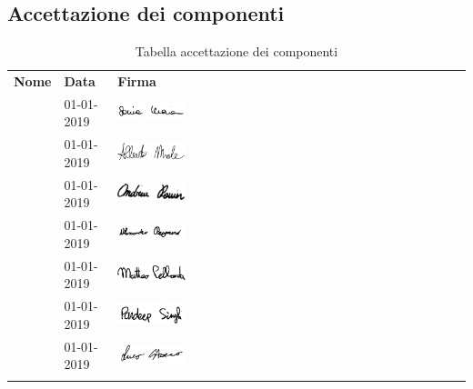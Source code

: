 \begin{appendix}
\subsection{Accettazione dei componenti}
\begin{center}
	\renewcommand{\arraystretch}{1.5}
	\begin{longtable}[H]{  p{3.5cm}  p{2cm} p{4cm}  }
		\rowcolor{tableHeadYellow}
		\textbf{Nome}   & \textbf{Data} & \textbf{Firma}\\
		\sonia & 01-01-2019 & \includegraphics[width=0.2\textwidth]{../includes/pics/firme/firma_sonia.png}\\
		\alberto & 01-01-2019 & \includegraphics[width=0.2\textwidth]{../includes/pics/firme/firma_alberto.png}\\
		\andrea & 01-01-2019 & \includegraphics[width=0.2\textwidth]{../includes/pics/firme/firma_andrea.png}\\
		\alessandro & 01-01-2019 & \includegraphics[width=0.2\textwidth]{../includes/pics/firme/firma_alessandro.png}\\
		\matteo & 01-01-2019 & \includegraphics[width=0.2\textwidth]{../includes/pics/firme/firma_matteo.png}\\
		\pardeep & 01-01-2019 & \includegraphics[width=0.2\textwidth]{../includes/pics/firme/firma_pardeep.png}\\
		\luca & 01-01-2019 & \includegraphics[width=0.2\textwidth]{../includes/pics/firme/firma_luca.png}\\
		\rowcolor{white}
		\caption{Tabella accettazione dei componenti}
	\end{longtable}
\end{center}

\end{appendix}
